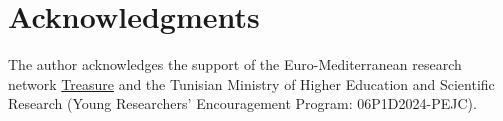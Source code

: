 \documentclass[runningheads]{llncs}
\begin{document}
\section*{Acknowledgments}
The author acknowledges the support of the Euro-Mediterranean research network \href{https://treasure.hub.inrae.fr/}{Treasure}
 and the Tunisian Ministry of Higher Education and Scientific Research (Young Researchers' Encouragement Program: 06P1D2024-PEJC).
%
% 
%   
%
\end{document}
